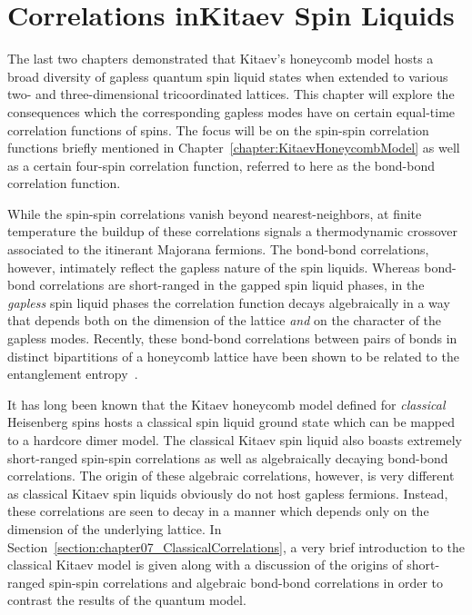 \chapter[Correlations in Kitaev Spin Liquids]{Correlations in\linebreak Kitaev Spin Liquids}
\label{chapter:SpinCorrelationsOfKSL}
%
%
The last two chapters demonstrated that Kitaev's honeycomb model hosts a broad diversity of gapless quantum spin liquid states when extended to various two- and three-dimensional tricoordinated lattices.
This chapter will explore the consequences which the corresponding gapless modes have on certain equal-time correlation functions of spins.
The focus will be on the spin-spin correlation functions briefly mentioned in Chapter~\ref{chapter:KitaevHoneycombModel} as well as a certain four-spin correlation function, referred to here as the bond-bond correlation function.

While the spin-spin correlations vanish beyond nearest-neighbors, at finite temperature the buildup of these correlations signals a thermodynamic crossover associated to the itinerant Majorana fermions.
The bond-bond correlations, however, intimately reflect the gapless nature of the spin liquids.
Whereas bond-bond correlations are short-ranged in the gapped spin liquid phases, in the \textit{gapless} spin liquid phases the correlation function decays algebraically in a way that depends both on the dimension of the lattice \textit{and} on the character of the gapless modes.
Recently, these bond-bond correlations between pairs of bonds in distinct bipartitions of a honeycomb lattice have been shown to be related to the entanglement entropy~\cite{YangARXIV2019}.

It has long been known that the Kitaev honeycomb model defined for \textit{classical} Heisenberg spins hosts a classical spin liquid ground state which can be mapped to a hardcore dimer model.
The classical Kitaev spin liquid also boasts extremely short-ranged spin-spin correlations as well as algebraically decaying bond-bond correlations.
The origin of these algebraic correlations, however, is very different as classical Kitaev spin liquids obviously do not host gapless fermions.
Instead, these correlations are seen to decay in a manner which depends only on the dimension of the underlying lattice.
In Section~\ref{section:chapter07_ClassicalCorrelations}, a very brief introduction to the classical Kitaev model is given along with a discussion of the origins of short-ranged spin-spin correlations and algebraic bond-bond correlations in order to contrast the results of the quantum model.

